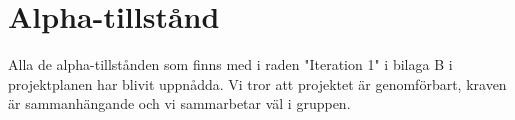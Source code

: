 \section{Alpha-tillstånd}
Alla de alpha-tillstånden som finns med i raden "Iteration 1" i bilaga B i projektplanen har blivit uppnådda. Vi tror att projektet är genomförbart, kraven är sammanhängande och vi sammarbetar väl i gruppen.   